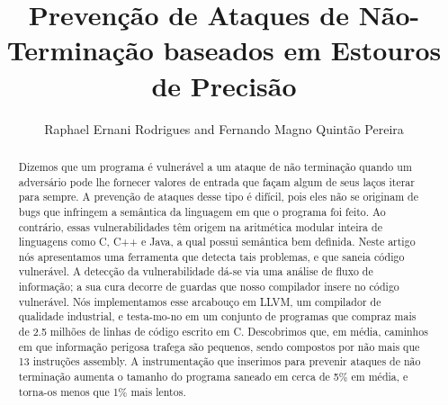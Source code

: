 \documentclass{llncs}
\begin{document}
\title{Prevenção de Ataques de Não-Terminação baseados em
Estouros de Precisão}

\author{Raphael Ernani Rodrigues and Fernando Magno Quintão Pereira}



\maketitle

\begin{abstract}
Dizemos que um programa é vulnerável a um ataque de não terminação quando
um adversário pode lhe fornecer valores de entrada que façam algum de seus laços 
iterar para sempre.
A prevenção de ataques desse tipo é difícil, pois eles não se originam de bugs 
que infringem a semântica da linguagem em que o programa foi feito.
Ao contrário, essas vulnerabilidades têm origem na aritmética modular inteira de 
linguagens como C, C++ e Java, a qual possui semântica bem definida.
Neste artigo nós apresentamos uma ferramenta que detecta tais problemas, 
e que saneia código vulnerável.
A detecção da vulnerabilidade dá-se via uma análise de fluxo de informação;
a sua cura decorre de guardas que nosso compilador insere no código vulnerável.
Nós implementamos esse arcabouço em LLVM, um compilador de qualidade industrial, 
e testa-mo-no em um conjunto de programas que compraz mais de
2.5 milhões de linhas de código escrito em C.
Descobrimos que, em média, caminhos em que informação perigosa trafega são 
pequenos, sendo compostos por não mais que 13 instruções assembly.
A instrumentação que inserimos para prevenir ataques de não terminação aumenta o 
tamanho do programa saneado em cerca de 5\% em média, e torna-os menos que 1\% 
mais lentos.
\end{abstract}
\end{document}
